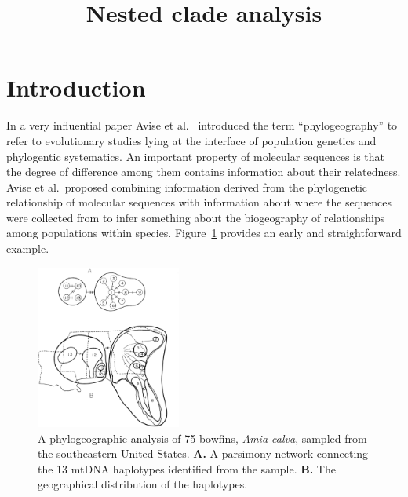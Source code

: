 \documentclass[12pt]{article}
\title{Nested clade analysis}
\begin{document}
\maketitle

\thispagestyle{first}

\section*{Introduction}

In a very influential paper Avise et al.~\cite{Avise-etal-1987}
introduced the term ``phylogeography'' to refer to evolutionary
studies lying at the interface of population genetics and phylogentic
systematics. An important property of molecular sequences is that the
degree of difference among them contains information about their
relatedness. Avise et al.\ proposed combining information derived from
the phylogenetic relationship of molecular sequences with information
about where the sequences were collected from to infer something about
the biogeography of relationships among populations within
species. Figure~\ref{fig:bowfin} provides an early and straightforward
example.

\begin{figure}
\begin{center}
\includegraphics[width=0.425\textwidth]{bowfin-phylogeography.eps}
\end{center}
\caption{A phylogeographic analysis of 75 bowfins, {\it Amia calva\/},
  sampled from the southeastern United States. {\bf A.} A parsimony
  network connecting the 13 mtDNA haplotypes identified from the
  sample. {\bf B.} The geographical distribution of the
  haplotypes.}\label{fig:bowfin}
\end{figure}
\end{document}
